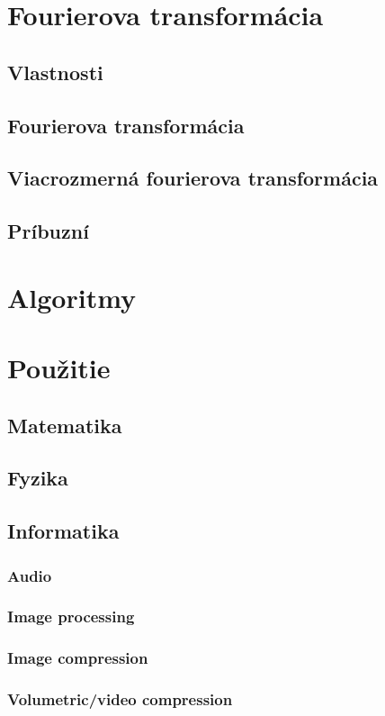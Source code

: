 



\chapter{Fourierova transformácia}
    
    
    
\section{Vlastnosti}
\section{Fourierova transformácia}
\section{Viacrozmerná fourierova transformácia}
\section{Príbuzní}

\chapter{Algoritmy}
    
    
    
    
    
    
    
    
    
    

\chapter{Použitie}
\section{Matematika}
    
    
    
    
    
         
\section{Fyzika}
    
    
    
    
    
\section{Informatika}
    
    \subsection{Audio}
    \subsection{Image processing}
    \subsection{Image compression}
    \subsection{Volumetric/video compression}
     
